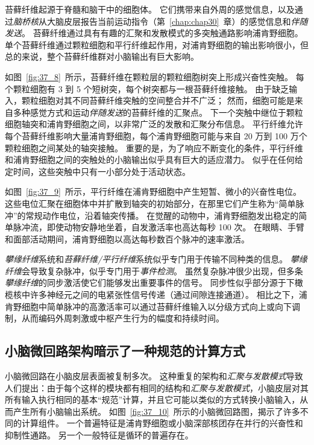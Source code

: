苔藓纤维起源于脊髓和脑干中的细胞体。
它们携带来自外周的感觉信息，以及通过\textit{脑桥核}从大脑皮层报告当前运动指令（第~\ref{chap:chap30}~章）的感觉信息和\textit{伴随发送}。
苔藓纤维通过具有有趣的汇聚和发散模式的多突触通路影响浦肯野细胞。
单个苔藓纤维通过颗粒细胞和平行纤维起作用，对浦肯野细胞的输出影响很小，但总的来说，整个苔藓纤维群对小脑输出有巨大影响。


如图~\ref{fig:37_8}~所示，苔藓纤维在颗粒层的颗粒细胞树突上形成兴奋性突触。
每个颗粒细胞有 3 到 5 个短树突，每个树突都与一根苔藓纤维接触。
由于缺乏输入，颗粒细胞对其不同苔藓纤维突触的空间整合并不广泛；
然而，细胞可能是来自多种感觉方式和运动\textit{伴随发送}的苔藓纤维的汇聚点。
下一个突触中继位于颗粒细胞轴突和浦肯野细胞之间，以非常广泛的发散和汇聚分布信息。
平行纤维允许每个苔藓纤维影响大量浦肯野细胞，每个浦肯野细胞可能与来自 20 万到 100 万个颗粒细胞之间某处的轴突接触。
重要的是，为了响应不断变化的条件，平行纤维和浦肯野细胞之间的突触处的小脑输出似乎具有巨大的适应潜力。
似乎在任何给定时间，这些突触中只有一小部分处于活动状态。


如图~\ref{fig:37_9}~所示，平行纤维在浦肯野细胞中产生短暂、微小的兴奋性电位。
这些电位汇聚在细胞体中并扩散到轴突的初始部分，在那里它们产生称为“简单脉冲”的常规动作电位，沿着轴突传播。
在觉醒的动物中，浦肯野细胞发出稳定的简单脉冲流，即使动物安静地坐着，自发激活率也高达每秒 100 次。
在眼睛、手臂和面部活动期间，浦肯野细胞以高达每秒数百个脉冲的速率激活。


\textit{攀缘纤维}系统和\textit{苔藓纤维/平行纤维}系统似乎专门用于传输不同种类的信息。
\textit{攀缘纤维}会导致复杂脉冲，似乎专门用于\textit{事件检测}。
虽然复杂脉冲很少出现，但多条\textit{攀缘纤维}的同步激活使它们能够发出重要事件的信号。
同步性似乎部分源于下橄榄核中许多神经元之间的电紧张性信号传递（通过间隙连接通道）。
相比之下，浦肯野细胞中简单脉冲的高激活率可以通过苔藓纤维输入以分级方式向上或向下调制，从而编码外周刺激或中枢产生行为的幅度和持续时间。


\subsection{小脑微回路架构暗示了一种规范的计算方式}

小脑微回路在小脑皮层表面被复制多次。
这种重复的架构和\textit{汇聚与发散模式}导致人们提出：由于每个这样的模块都有相同的结构和\textit{汇聚与发散模式}，小脑皮层对其所有输入执行相同的基本“规范”计算，并且它可能以类似的方式转换小脑输入，从而产生所有小脑输出系统。
如图~\ref{fig:37_10}~所示的小脑微回路图，揭示了许多不同的计算组件。
一个普遍特征是浦肯野细胞或小脑深部核团存在并行的兴奋性和抑制性通路。
另一个一般特征是循环的普遍存在。


